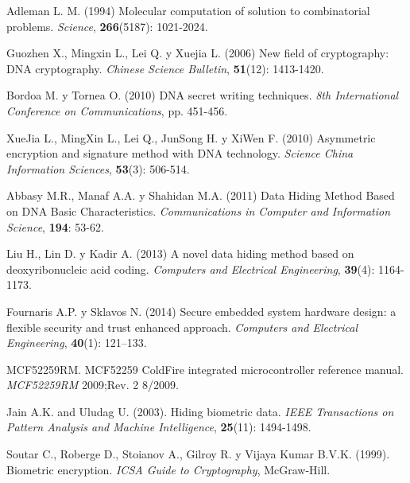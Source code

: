 \begin{thebibliography}{00}
Adleman L. M. (1994)
\newblock Molecular computation of solution to combinatorial problems.
\newblock \emph{Science}, \textbf{266}(5187): 1021-2024.

Guozhen X., Mingxin L., Lei Q. y Xuejia L. (2006)
\newblock New field of cryptography: DNA cryptography.
\newblock \emph{Chinese Science Bulletin}, \textbf{51}(12): 1413-1420.

Bordoa M. y Tornea O. (2010)
\newblock DNA secret writing techniques.
\newblock \emph{8th International Conference on Communications}, pp. 451-456.

XueJia L., MingXin L., Lei Q., JunSong H. y XiWen F. (2010)
\newblock Asymmetric encryption and signature method with DNA technology.
\newblock \emph{Science China Information Sciences}, \textbf{53}(3): 506-514.

Abbasy M.R., Manaf A.A. y Shahidan M.A. (2011)
\newblock Data Hiding Method Based on DNA Basic Characteristics.
\newblock \emph{Communications in Computer and Information Science}, \textbf{194}: 53-62.

Liu H., Lin D. y Kadir A. (2013)
\newblock A novel data hiding method based on deoxyribonucleic acid coding.
\newblock \emph{Computers and Electrical Engineering}, \textbf{39}(4): 1164-1173.

Fournaris A.P. y Sklavos N. (2014)
\newblock Secure embedded system hardware design: a flexible security and trust enhanced approach.
\newblock \emph{Computers and Electrical Engineering}, \textbf{40}(1): 121–133.

MCF52259RM.
\newblock MCF52259 ColdFire integrated microcontroller reference manual.
\newblock \emph{MCF52259RM} 2009;Rev. 2 8/2009.

Jain A.K. and Uludag U. (2003).
\newblock Hiding biometric data.
\newblock \emph{IEEE Transactions on Pattern Analysis and Machine Intelligence}, \textbf{25}(11): 1494-1498.

Soutar C., Roberge D., Stoianov A., Gilroy R. y Vijaya Kumar B.V.K. (1999).
\newblock Biometric encryption.
\newblock \emph{ICSA Guide to Cryptography}, McGraw-Hill.


\end{thebibliography}
